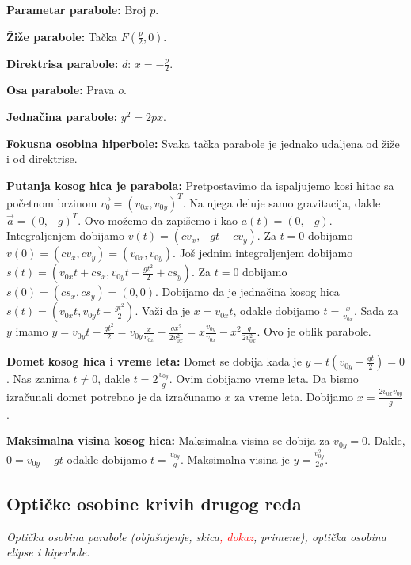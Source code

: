\documentclass[12pt]{article}
\newcommand{\vek}[1]{\overrightarrow{#1}}
\newcommand{\ocena}[1]{\textcolor{red}{#1}}
\begin{document}
\textbf{Parametar parabole:} Broj $p$.
\par

\textbf{Žiže parabole:} Tačka $F(\frac{p}{2},0)$.
\par

\textbf{Direktrisa parabole:} $d$: $x=-\frac{p}{2}$.
\par

\textbf{Osa parabole:} Prava $o$.
\par

\textbf{Jednačina parabole:} $y^2=2px$.
\par

\textbf{Fokusna osobina hiperbole:} Svaka tačka parabole je jednako udaljena od
žiže i od direktrise.
\par

\textbf{Putanja kosog hica je parabola:} Pretpostavimo da ispaljujemo kosi
hitac sa početnom brzinom $\vek{v_0}=(v_{0x},v_{0y})^T$. Na njega deluje samo
gravitacija, dakle $\vek{a}=(0,-g)^T$. Ovo možemo da zapišemo i kao
$a(t)=(0,-g)$. Integraljenjem dobijamo $v(t)=(cv_x,-gt+cv_y)$. Za $t=0$
dobijamo $v(0)=(cv_x,cv_y)=(v_{0x},v_{0y})$. Još jednim integraljenjem dobijamo
$s(t)=(v_{0x}t+cs_x,v_{0y}t-\frac{gt^2}{2}+cs_y)$. Za $t=0$ dobijamo
$s(0)=(cs_x,cs_y)=(0,0)$. Dobijamo da je jednačina kosog hica
$s(t)=(v_{0x}t,v_{0y}t-\frac{gt^2}{2})$. Važi da je $x=v_{0x}t$, odakle
dobijamo $t=\frac{x}{v_{0x}}$. Sada za $y$ imamo $y=v_{0y}t-\frac{gt^2}{2}=
    v_{0y}\frac{x}{v_{0x}}-\frac{gx^2}{2v_{0x}^2}=
    x\frac{v_{0y}}{v_{0x}}-x^2\frac{g}{2v_{0x}^2}$. Ovo je oblik parabole.
\par

\textbf{Domet kosog hica i vreme leta:} Domet se dobija kada je
$y=t(v_{0y}-\frac{gt}{2})=0$. Nas zanima $t\neq0$, dakle $t=2\frac{v_{0y}}{g}$.
Ovim dobijamo vreme leta. Da bismo izračunali domet potrebno je da izračunamo
$x$ za vreme leta. Dobijamo $x=\frac{2v_{0x}v_{0y}}{g}$.
\par

\textbf{Maksimalna visina kosog hica:} Maksimalna visina se dobija za
$v_{0y}=0$. Dakle, $0=v_{0y}-gt$ odakle dobijamo $t=\frac{v_{0y}}{g}$.
Maksimalna visina je $y=\frac{v_{0y}^2}{2g}$.
\par


\subsection{Optičke osobine krivih drugog reda}
\textit{Optička osobina parabole (objašnjenje, skica\ocena{, dokaz}, primene), optička
    osobina elipse i hiperbole.}
\par
\vspace*{1cm}
\end{document}
